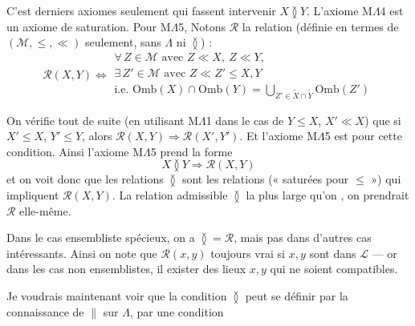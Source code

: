 \documentclass[11pt,a4paper]{article}
\begin{document}
C'est   derniers axiomes seulement qui fassent intervenir $X \between Y$. L'axiome M$\Lambda$4 est un axiome de saturation. Pour M$\Lambda$5,  Notons $\mathcal{R}$ la relation (définie en termes de $(\mathcal{M}, \leq, \ll)$ seulement, sans  \ill{} $\Lambda$ ni $\between$) :
\[
  \mathcal{R}(X, Y) \iff
  \begin{array}{l}
    \forall\, Z \in \mathcal{M} \text{ avec } Z \ll X,\ Z \ll Y, \\
    \exists\, Z' \in \mathcal{M} \text{ avec } Z \ll Z' \leq X, Y \\
    \text{i.e. } \mathrm{Omb}(X) \cap \mathrm{Omb}(Y) = \bigcup_{Z' \in \widetilde{X} \cap \widetilde{Y}} \mathrm{Omb}(Z')
  \end{array}
\]


On vérifie tout de suite (en utilisant M$\Lambda$1 dans le cas de $Y \leq X$, $X' \ll X$) que  si $X' \leq X$, $Y' \leq Y$, alors $\mathcal{R}(X, Y) \Longrightarrow \mathcal{R}(X', Y')$. Et l'axiome M$\Lambda$5 est \ill{} \ill{} pour cette condition. Ainsi l'axiome M$\Lambda$5 prend la forme
\[
  X \between Y \Longrightarrow \mathcal{R}(X, Y)
\]
et on voit donc que les relations  $\between$ sont les relations (« saturées pour $\leq$ ») qui impliquent $\mathcal{R}(X, Y)$. La relation admissible $\between$ la plus large qu'on , on prendrait $\mathcal{R}$ elle-même.

Dans le cas  ensembliste spécieux, on a $\between = \mathcal{R}$, mais pas dans d'autres cas intéressants. Ainsi on note que $\mathcal{R}(x, y)$ toujours vrai si $x, y$ sont dans $\mathcal{L}$ — or dans les cas non ensemblistes, il  exister des lieux $x, y$ qui ne soient compatibles.

Je voudrais maintenant voir que la condition $\between$ peut se définir par la connaissance de $\parallel$ sur $\Lambda$, par une condition
\end{document}
